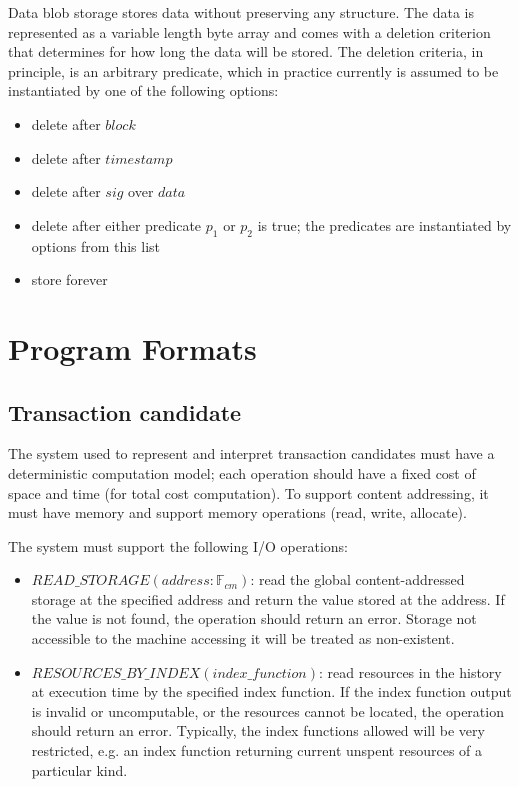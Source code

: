 Data blob storage stores data without preserving any structure. The data is represented as a variable length byte array and comes with a deletion criterion that determines for how long the data will be stored. The deletion criteria, in principle, is an arbitrary predicate, which in practice currently is assumed to be instantiated by one of the following options:
\begin{itemize}
    \item delete after $block$
    \item delete after $timestamp$
    \item delete after $sig$ over $data$
    \item delete after either predicate $p_1$ or $p_2$ is true; the predicates are instantiated by options from this list
    \item store forever
\end{itemize}

\section{Program Formats}
\subsection{Transaction candidate} \label{tx-candidate-program-format} %
The system used to represent and interpret transaction candidates must have a deterministic computation model; each operation should have a fixed cost of space and time (for total cost computation). To support content addressing, it must have memory and support memory operations (read, write, allocate). 

The system must support the following I/O operations:
\begin{itemize}
    \item $READ\_STORAGE(address: \mathbb{F}_{cm})$: read the global content-addressed storage at the specified address and return the value stored at the address. If the value is not found, the operation should return an error. Storage not accessible to the machine accessing it will be treated as non-existent.
    \item $RESOURCES\_BY\_INDEX(index\_function)$: read resources in the history at execution time by the specified index function. If the index function output is invalid or uncomputable, or the resources cannot be located, the operation should return an error. Typically, the index functions allowed will be very restricted, e.g. an index function returning current unspent resources of a particular kind.
\end{itemize}


